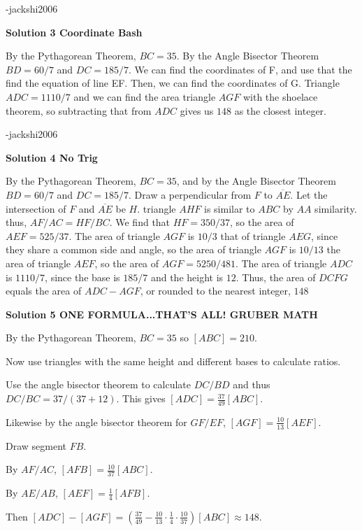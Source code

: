 \begin{enumerate}
 -jackshi2006

 



\textbf{Solution 3 Coordinate Bash}

By the Pythagorean Theorem, $BC=35$. By the Angle Bisector Theorem $BD = 60/7$ and $DC = 185/7$. We can find the coordinates of F, and use that the find the equation of line EF. Then, we can find the coordinates of G. Triangle $ADC = 1110/7$ and we can find the area triangle $AGF$ with the shoelace theorem, so subtracting that from $ADC$ gives us $\boxed{148}$ as the closest integer.

 -jackshi2006

 


 



\textbf{Solution 4 No Trig}

By the Pythagorean Theorem, $BC = 35$, and by the Angle Bisector Theorem $BD = 60/7$ and $DC = 185/7$. Draw a perpendicular from $F$ to $\overline{AE}$. Let the intersection of $F$ and $\overline{AE}$ be $H$. triangle $AHF$ is similar to $ABC$ by $AA$ similarity. thus, $AF/AC = HF/BC$. We find that $HF = 350/37$, so the area of $AEF = 525/37$. The area of triangle $AGF$ is $10/3$ that of triangle $AEG$, since they share a common side and angle, so the area of triangle $AGF$ is $10/13$ the area of triangle $AEF$, so the area of $AGF = 5250/481$. The area of triangle $ADC$ is $1110/7$, since the base is $185/7$ and the height is $12$. Thus, the area of $DCFG$ equals the area of $ADC - AGF$, or rounded to the nearest integer, $\boxed{148}$




\textbf{Solution 5 ONE FORMULA...THAT'S ALL! GRUBER MATH}

By the Pythagorean Theorem, $BC=35$ so $[ABC]=210$.

 Now use triangles with the same height and different bases to calculate ratios.

 Use the angle bisector theorem to calculate $DC/BD$ and thus $DC/BC=37/(37+12)$. This gives $[ADC]=\frac{37}{49}[ABC]$.

 Likewise by the angle bisector theorem for $GF/EF$, $[AGF]=\frac{10}{13}[AEF]$.

 Draw segment $FB$.

 By $AF/AC$, $[AFB]=\frac{10}{37}[ABC]$.

 By $AE/AB$, $[AEF]=\frac{1}{4}[AFB]$.

 Then $[ADC]-[AGF]=(\frac{37}{49}-\frac{10}{13}\cdot\frac{1}{4}\cdot\frac{10}{37})[ABC] \approx\boxed{148}$.


\end{enumerate}
